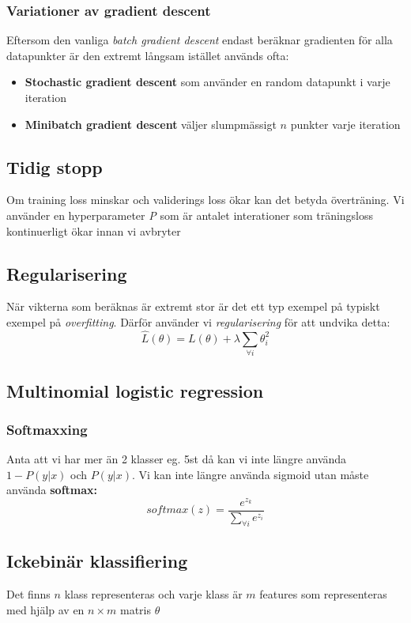 \documentclass[12pt,a4paper]{article}
\begin{document}
\subsubsection*{Variationer av gradient descent}
Eftersom den vanliga \textit{batch gradient descent} endast beräknar gradienten för alla datapunkter är den extremt långsam istället används ofta:
\begin{itemize}
    \item \textbf{Stochastic gradient descent} som använder en random datapunkt i varje iteration
    \item \textbf{Minibatch gradient descent} väljer slumpmässigt $n$ punkter varje iteration
\end{itemize}

\subsection*{Tidig stopp}
Om training loss minskar och validerings loss ökar kan det betyda överträning. Vi använder en hyperparameter \textit{P} som är antalet interationer som träningsloss kontinuerligt ökar innan vi avbryter

\subsection*{Regularisering}
När vikterna som beräknas är extremt stor är det ett typ exempel på typiskt exempel på \textit{overfitting}. Därför använder vi \textit{regularisering} för att undvika detta:
$$\hat{L}(\theta) = L(\theta) + \lambda \sum\limits_{\forall i} \theta_i^2$$

\subsection*{Multinomial logistic regression}
\subsubsection*{Softmaxxing}
Anta att vi har mer än 2 klasser eg. 5st då kan vi inte längre använda $1-P(y|x)$ och $P(y|x)$. Vi kan inte längre använda sigmoid utan måste använda \textbf{softmax:}
$$softmax(z) = \frac{e^{z_k}}{\sum\limits_{\forall i} e^{z_i}}$$

\newpage
\subsection*{Ickebinär klassifiering}
Det finns $n$ klass representeras och varje klass är $m$ features som representeras med hjälp av en $n \times m$ matris $\theta$
\end{document}
